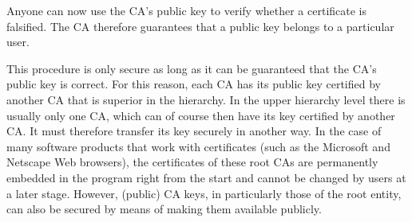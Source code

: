Anyone can now use the CA's public key to verify whether a certificate is
falsified. The CA therefore guarantees that a public key belongs to a
particular user.

This procedure is only secure as long as it can be guaranteed that the CA's
public key is correct. For this reason, each CA has its public key certified
by another CA that is superior in the hierarchy. In the upper hierarchy level
there is usually only one CA, which can of course then have its key certified
by another CA. It must therefore transfer its key securely in another way.
In the case of many software products that work with certificates (such as
the Microsoft and Netscape Web browsers), the certificates of these root CAs
are permanently embedded in the program right from the start and cannot be
changed by users at a later stage. However, (public) CA keys, in particularly
those of the root entity, can also be secured by means of making them
available publicly.


